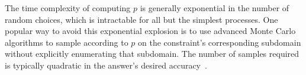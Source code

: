 \documentclass{llncs}
\newcommand{\smallmathfont}{\fontsize{7.5}{9}\selectfont}
\begin{document}
The time complexity of computing $p$ is generally exponential in the number of random choices, which is intractable for all but the simplest processes.
One popular way to avoid this exponential explosion is to use advanced Monte Carlo algorithms to sample according to $p$ on the constraint's corresponding subdomain without explicitly enumerating that subdomain.
The number of samples required is typically quadratic in the answer's desired accuracy~\cite[Sec. 12.2]{cit:degroot-2012book-probability}.

\begin{figure}[!tb]\centering
\tab\ 
\end{figure}
\end{document}
